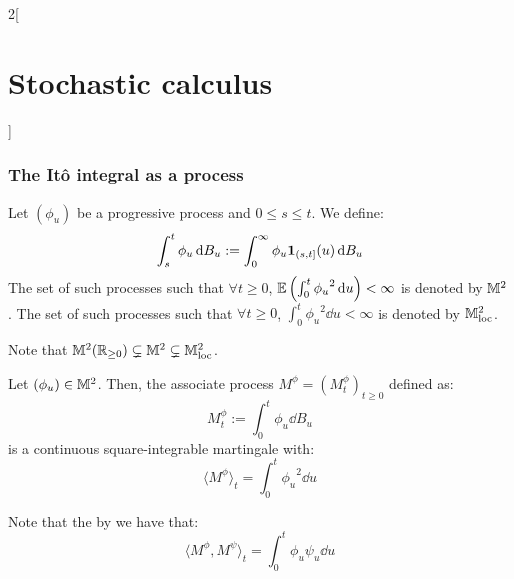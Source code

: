 \documentclass[../../../main_math.tex]{subfiles}
\begin{document}
\begin{multicols}{2}[\section{Stochastic calculus}]
  \subsubsection{The Itô integral as a process}
  \begin{definition}
    Let ${(\phi_u)}$ be a progressive process and $0\leq s\leq t$. We define:
    $$
      \int_s^t \phi_u\dd{B_u}:=\int_0^\infty \phi_u\boldsymbol{\mathrm{1}}_{(s,t]}(u)\dd{B_u}
    $$
    The set of such processes such that $\forall t\geq 0$, $\mathbb{E}\left(\int_0^t{\phi_u}^2\dd{u}\right)<\infty$ is denoted by $\mathbb{M}^2$. The set of such processes such that $\forall t\geq 0$, $\int_0^t{\phi_u}^2\dd{u}<\infty$ is denoted by $\mathbb{M}^2_{\text{loc}}$.
  \end{definition}
  \begin{remark}
    Note that $\mathbb{M}^2(\mathbb{R}_{\geq 0})\subsetneq \mathbb{M}^2\subsetneq \mathbb{M}^2_{\text{loc}}$.
  \end{remark}
  \begin{theorem}
    Let $(\phi_u)\in\mathbb{M}^2$. Then, the associate process $M^\phi={(M_t^\phi)}_{t\geq 0}$ defined as:
    $$
      M_t^\phi:=\int_0^t \phi_u\dd{B_u}
    $$
    is a continuous square-integrable martingale with:
    $$
      {\langle M^\phi\rangle}_t=\int_0^t{\phi_u}^2\dd{u}
    $$
  \end{theorem}
  \begin{remark}
    Note that the by  we have that:
    $$
      {\langle M^\phi,M^\psi\rangle}_t=\int_0^t \phi_u\psi_u\dd{u}
    $$
  \end{remark}

\end{multicols}
\end{document}
